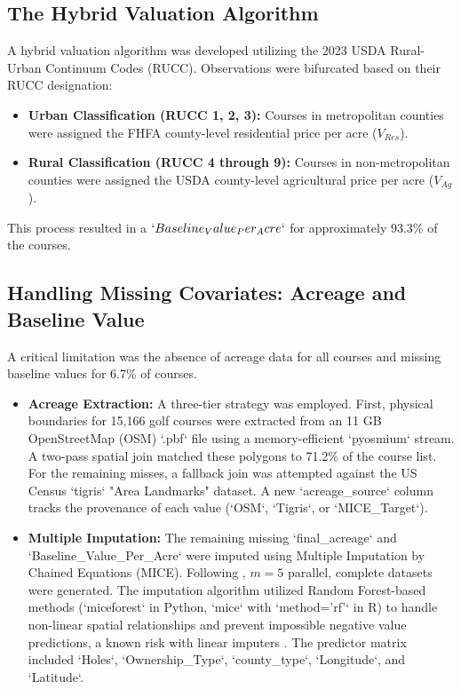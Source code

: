 \documentclass[10pt, letterpaper]{article}
\begin{document}
\subsection{The Hybrid Valuation Algorithm}
A hybrid valuation algorithm was developed utilizing the 2023 USDA Rural-Urban Continuum Codes (RUCC). Observations were bifurcated based on their RUCC designation:
\begin{itemize}
    \item \textbf{Urban Classification (RUCC 1, 2, 3):} Courses in metropolitan counties were assigned the FHFA county-level residential price per acre ($V_{Res}$).
    \item \textbf{Rural Classification (RUCC 4 through 9):} Courses in non-metropolitan counties were assigned the USDA county-level agricultural price per acre ($V_{Ag}$).
\end{itemize}
This process resulted in a $`Baseline_Value_Per_Acre`$ for approximately 93.3\% of the courses.

\subsection{Handling Missing Covariates: Acreage and Baseline Value}
A critical limitation was the absence of acreage data for all courses and missing baseline values for 6.7\% of courses.
\begin{itemize}
    \item \textbf{Acreage Extraction:} A three-tier strategy was employed. First, physical boundaries for 15,166 golf courses were extracted from an 11 GB OpenStreetMap (OSM) `.pbf` file using a memory-efficient `pyosmium` stream. A two-pass spatial join matched these polygons to 71.2\% of the course list. For the remaining misses, a fallback join was attempted against the US Census `tigris` "Area Landmarks" dataset. A new `acreage\_source` column tracks the provenance of each value (`OSM`, `Tigris`, or `MICE\_Target`).
    \item \textbf{Multiple Imputation:} The remaining missing `final\_acreage` and `Baseline\_Value\_Per\_Acre` were imputed using Multiple Imputation by Chained Equations (MICE). Following \textcite{Rubin1987}, $m = 5$ parallel, complete datasets were generated. The imputation algorithm utilized Random Forest-based methods (`miceforest` in Python, `mice` with `method='rf'` in R) to handle non-linear spatial relationships and prevent impossible negative value predictions, a known risk with linear imputers \parencite{Burren2018}. The predictor matrix included `Holes`, `Ownership\_Type`, `county\_type`, `Longitude`, and `Latitude`.
\end{itemize}
\end{document}
